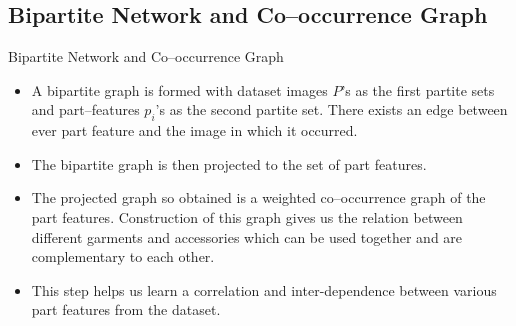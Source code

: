 \documentclass[10pt]{beamer}
\begin{document}
\subsection{Bipartite Network and Co--occurrence Graph}
\begin{frame}{Bipartite Network and Co--occurrence Graph}{}
\begin{itemize}
\item A bipartite graph is formed with dataset images $P$'s as the first partite sets and part--features $p_i$'s as the second partite set. There exists an edge between ever part feature and the image in which it occurred.
\pause
\item The bipartite graph is then projected to the set of part features.
\pause
\item The projected graph so obtained is a weighted co--occurrence graph of the part features. Construction of this graph gives us the relation between different garments and accessories which can be used together and are complementary to each other.
\pause
\item This step helps us learn a correlation and inter-dependence between various part features from the dataset.
\end{itemize}




\end{frame}
\end{document}
